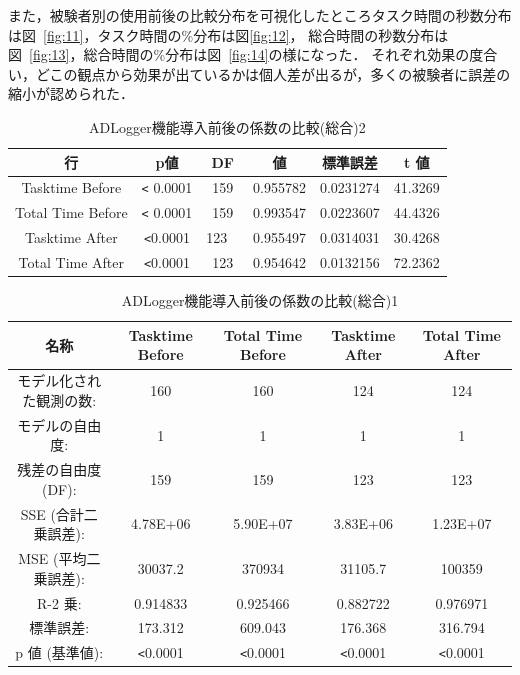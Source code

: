また，被験者別の使用前後の比較分布を可視化したところタスク時間の秒数分布は図~\ref{fig:11}，タスク時間の\%分布は図\ref{fig:12}，
総合時間の秒数分布は図~\ref{fig:13}，総合時間の\%分布は図~\ref{fig:14}の様になった．
それぞれ効果の度合い，どこの観点から効果が出ているかは個人差が出るが，多くの被験者に誤差の縮小が認められた．


\begin{table}[ht]
\centering
 \caption{ADLogger機能導入前後の係数の比較(総合)2}
\begin{tabular}{|c|c|c|c|c|c|} \hline
行 & p値 & DF  & 値 & 標準誤差 & t 値 \\\hline
Tasktime Before &\verb|<| 0.0001 & 159  & 0.955782 & 0.0231274 & 41.3269\\\hline
Total Time Before  &\verb|<| 0.0001 & 159  & 0.993547 & 0.0223607 & 44.4326 \\\hline
Tasktime After  &\verb|<|0.0001 & 123 \ & 0.955497 & 0.0314031 & 30.4268 \\\hline
Total Time After &\verb|<|0.0001 & 123 &  0.954642 & 0.0132156 & 72.2362\\\hline
\end{tabular}
  \label{tb:test1}
\end{table}

\begin{table}[ht]
\begin{center}
 \caption{ADLogger機能導入前後の係数の比較(総合)1}
\begin{tabular}{|c|c|c|c|c|} \hline
名称 & Tasktime Before & Total Time Before& Tasktime After & Total Time After \\\hline
モデル化された観測の数: & 160 & 160 & 124 & 124 \\\hline
モデルの自由度: & 1 & 1 & 1 & 1 \\\hline
残差の自由度 (DF): & 159 & 159 & 123 & 123 \\\hline
SSE (合計二乗誤差): & 4.78E+06 & 5.90E+07 & 3.83E+06 & 1.23E+07 \\\hline
MSE (平均二乗誤差): & 30037.2 & 370934 & 31105.7 & 100359 \\\hline
R-2 乗: & 0.914833 & 0.925466 & 0.882722 & 0.976971 \\\hline
標準誤差: & 173.312 & 609.043 & 176.368 & 316.794 \\\hline
p 値 (基準値): & \verb|<|0.0001 & \verb|<|0.0001 & \verb|<|0.0001 & \verb|<|0.0001\\\hline
\end{tabular}
  \label{tb:test2}
\end{center}
\end{table}


